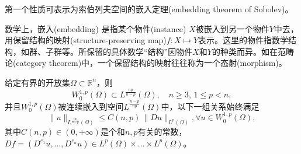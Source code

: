 第一个性质可表示为索伯列夫空间的嵌入定理(embedding theorem of Sobolev)。

\begin{definition}[嵌入]
  \label{definition:sobolev-spaces-embeddings}
  数学上，嵌入(embedding) 是指某个物件(instance) $X$被嵌入到另一个物件$Y$中去，用保留结构的映射(structure-preserving map)$f: X \mapsto Y$表示。这里的物件指数学结构，如群、子群等。所保留的具体数学``结构''因物件$X$和$Y$的种类而异。如在范畴论(category theorem)中，一个保留结构的映射往往称为一个态射(morphism)。
\end{definition}

\begin{theorem}[索伯列夫空间的嵌入定理$C=C(n,p)$]
  \label{theorem:sobolev-embedding-theorem}
给定有界的开放集$\Omega \subset \mathbb{R}^n$，则
\begin{equation*}
  W_0^{1,p}(\Omega) \subset L^{\frac{np}{n-p}}(\Omega), \quad n \ge 3, \,  1 \le p < n,
\end{equation*}
并且$W_0^{1,p}(\Omega)$被连续嵌入到空间$L^{\frac{n-p}{np}}(\Omega)$中，以下一组关系始终满足
\begin{equation}
  \label{eq:sobolev-embeddings-theorem-constant-def}
  \big\| u \big\|_{L^{\frac{np}{n-p}}(\Omega)} \le C(n,p)\, \big\| D u \big\|_{L^{p}(\Omega)}, \forall u \in W_0^{1,p}(\Omega),
\end{equation}
其中$C(n,p) \in (0,+\infty)$是个和$n,p$有关的常数，$D f = \left( D^{e_1} u, \ldots, D^{e_n} u\right) \in L^p(\Omega) \times \ldots \times L^p(\Omega)$。
\end{theorem}
